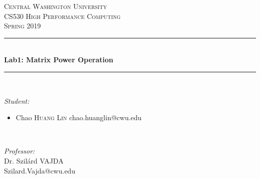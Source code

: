 \documentclass[12pt]{article}
\begin{document}
    
    \begin{titlepage}
        
        \newcommand{\HRule}{\rule{\linewidth}{0.5mm}} %
        
        \center %
        
        
        \textsc{\LARGE Central Washington University}\\[1.5cm] %
        \textsc{\Large CS530 High Performance Computing}\\[0.5cm] %
        \textsc{\large Spring 2019}\\[0.5cm] %
        
        
        \HRule \\[0.4cm]
        { \huge \bfseries Lab1: Matrix Power Operation}\\[0.2cm] %
        \HRule \\[1cm]
        
        
        \begin{minipage}{0.5\textwidth}
            \begin{flushleft} \large
                \emph{Student:}\\
                \begin{itemize}
                    \item Chao \textsc{Huang Lin} chao.huanglin@cwu.edu
                
                \end{itemize}
            \end{flushleft}
        \end{minipage}
        ~
        \begin{minipage}{0.45\textwidth}
            \begin{flushright} \large
                \emph{Professor:} \\
                Dr. Szilárd \textsc{VAJDA}\\ %
                Szilard.Vajda@cwu.edu
            \end{flushright}
        \end{minipage}\\[0.5cm]
        

\end{titlepage}
\end{document}
